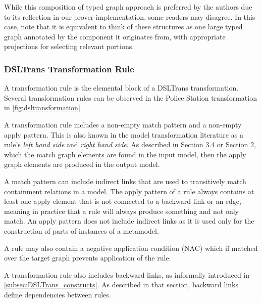 While this composition of typed graph approach is preferred by the authors due to its reflection in our prover implementation, some readers may disagree. In this case, note that it is equivalent to think of these structures as one large typed graph annotated by the component it originates from, with appropriate projections for selecting relevant portions.


\subsubsection*{DSLTrans Transformation Rule}

A transformation rule is the elemental block of a DSLTrans transformation. Several transformation rules can be observed in the Police Station transformation in \cref{fig:dsltransformation}.

A transformation rule includes a non-empty match pattern and a non-empty apply pattern. This is also known in the model transformation literature as a rule's \emph{left hand side} and \emph{right hand side}. As described in Section 3.4 or Section 2, which the match graph elements are found in the input model, then the apply graph elements are produced in the output model.

A match pattern can include indirect links that are used to transitively match containment relations in a model. The apply pattern of a rule always contains at least one apply element that is not connected to a backward link or an edge, meaning in practice that a rule will always produce something and not only match. An apply pattern does not include indirect links as it is used only for the construction of parts of instances of a metamodel.

A rule may also contain a negative application condition (NAC) which if matched over the target graph prevents application of the rule.

A transformation rule also includes backward links, as informally introduced in \cref{subsec:DSLTrans_constructs}. As described in that section, backward links define dependencies between rules. 


